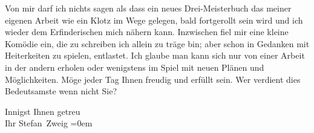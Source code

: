 \pstart
           Von mir darf ich nichts sagen als dass ein neues Drei-Meisterbuch das meiner eigenen Arbeit wie ein Klotz im
               Wege gelegen, bald fortgerollt sein wird und ich wieder dem Erfinderischen mich
               nähern kann. Inzwischen fiel mir eine kleine Komödie ein, die zu schreiben ich allein zu träge bin; aber schon in
               Gedanken mit Heiterkeiten zu spielen, entlastet. Ich glaube man kann sich nur von
               einer Arbeit in der andern erholen oder wenigstens im Spiel mit neuen Plänen und
               Möglichkeiten. Möge jeder Tag Ihnen freudig und erfüllt sein. Wer verdient dies
               Bedeutsamste wenn nicht Sie? \pend
           
\pstart
           Innigst Ihnen getreu{\\[\baselineskip]}Ihr \spacefill\mbox{Stefan Zweig}\pend
           \leftskip=0em{}\endnumbering{}
\begin{anhang}
\end{anhang}
      